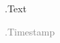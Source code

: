 \begin{flushright}
\colorbox{blue!20}{\parbox{0.7\textwidth}{ {{.Text}} }}

\small\textcolor{gray}{ {{.Timestamp}} }
\end{flushright}